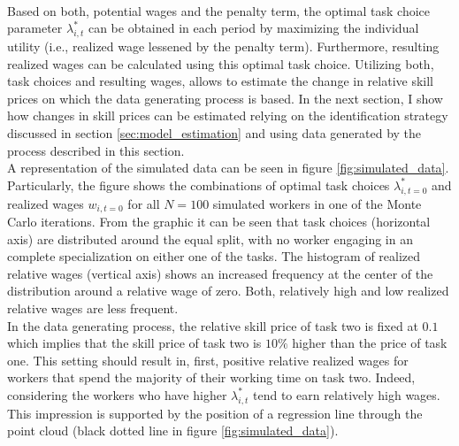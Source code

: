 \documentclass[../main.tex]{subfiles}
\begin{document}
\\
Based on both, potential wages and the penalty term, the optimal task choice parameter $\lambda_{i,t}^*$ can be obtained in each period by maximizing the individual utility (i.e., realized wage lessened by the penalty term). Furthermore, resulting realized wages can be calculated using this optimal task choice. Utilizing both, task choices and resulting wages, allows to estimate the change in relative skill prices on which the data generating process is based. In the next section, I show how changes in skill prices can be estimated relying on the identification strategy discussed in section \ref{sec:model_estimation} and using data generated by the process described in this section.
\\
A representation of the simulated data can be seen in figure \ref{fig:simulated_data}. Particularly, the figure shows the combinations of optimal task choices $\lambda_{i,t=0}^*$ and realized wages $w_{i,t=0}$ for all $N=100$ simulated workers in one of the Monte Carlo iterations. From the graphic it can be seen that task choices (horizontal axis) are distributed around the equal split, with no worker engaging in an complete specialization on either one of the tasks. The histogram of realized relative wages (vertical axis) shows an increased frequency at the center of the distribution around a relative wage of zero. Both, relatively high and low realized relative wages are less frequent.
\\
In the data generating process, the relative skill price of task two is fixed at $0.1$ which implies that the skill price of task two is $10 \%$ higher than the price of task one. This setting should result in, first, positive relative realized wages for workers that spend the majority of their working time on task two. Indeed, considering the workers who have higher $\lambda_{i,t}^*$ tend to earn relatively high wages. This impression is supported by the position of a regression line through the point cloud (black dotted line in figure \ref{fig:simulated_data}).
\end{document}
